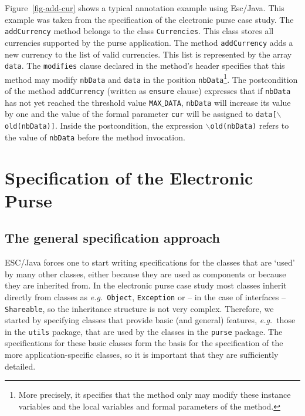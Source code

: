 \documentclass[a4paper]{llncs}
\begin{document}
Figure~\ref{fig-add-cur} shows a typical annotation example using
Esc/Java. This example was taken from the specification of the
electronic purse case study. The \texttt{addCurrency} method belongs
to the class \texttt{Currencies}. This class stores all currencies
supported by the purse application. The method
\texttt{addCurrency} adds a new currency to the list of valid
currencies. This list is represented by the
array \texttt{data}. The \texttt{modifies} clause declared in the
method's header specifies that
this method may modify \texttt{nbData} and
\texttt{data} in the position \texttt{nbData}\footnote{More precisely, it
specifies that the method only may modify these instance variables and
the local variables and formal parameters of the method.}. The
postcondition of the method \texttt{addCurrency} (written as
\texttt{ensure} clause) expresses that if \texttt{nbData} has not
yet reached the threshold value \texttt{MAX$\_$DATA}, \texttt{nbData}
will increase its value by one and the value of the formal parameter
\texttt{cur} will be assigned to \texttt{data[\(\backslash\)old(nbData)]}. 
Inside the postcondition, the expression
\texttt{$\backslash$old(nbData)} refers to the value of
\texttt{nbData} before the method invocation.






\section{Specification of the Electronic Purse}
\label{SectSpecPurse}


\subsection{The general specification approach}
ESC/Java forces one to start writing specifications for the classes
that are `used' by many other classes, either because they are used as 
components or because they are inherited from. In the electronic purse 
case study most classes inherit directly from classes as
\emph{e.g.}~\texttt{Object}, \texttt{Exception} or -- in the case of
interfaces -- \texttt{Shareable}, so the inheritance structure is not
very complex. Therefore, we started by specifying classes that
provide basic (and general) features, \emph{e.g.}~those in the
\texttt{utils} package,
that are used by the classes in the \texttt{purse} package. The
specifications for these basic classes form the basis for the
specification of the more application-specific classes, so it is
important that they are sufficiently detailed.
\end{document}
